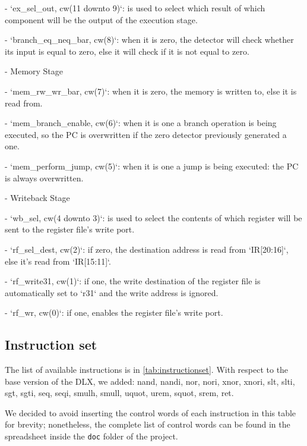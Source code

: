 \begin{markdown}
    - `ex_sel_out, cw(11 downto 9)`: is used to select which result of which component will be the output of the execution stage. 

    - `branch_eq_neq_bar, cw(8)`: when it is zero, the detector will check whether its input is equal to zero, else it will check if it is not equal to zero.

- Memory Stage

    - `mem_rw_wr_bar, cw(7)`: when it is zero, the memory is written to, else it is read from.

    - `mem_branch_enable, cw(6)`: when it is one a branch operation is being executed, so the PC is overwritten if the zero detector previously generated a one.

    - `mem_perform_jump, cw(5)`: when it is one a jump is being executed: the PC is always overwritten.

- Writeback Stage

    - `wb_sel, cw(4 downto 3)`: is used to select the contents of which register will be sent to the register file's write port.

    - `rf_sel_dest, cw(2)`: if zero, the destination address is read from `IR[20:16]`, else it's read from `IR[15:11]`.

    - `rf_write31, cw(1)`: if one, the write destination of the register file is automatically set to `r31` and the write address is ignored.

    - `rf_wr, cw(0)`: if one, enables the register file's write port.
 
\end{markdown}

\subsection{Instruction set}

The list of available instructions is in \autoref{tab:instructionset}.
With respect to the base version of the DLX, we added: nand, nandi, nor, nori, xnor, xnori, slt, slti, sgt, sgti, seq, seqi, smulh, smull, uquot, urem, squot, srem, ret.

We decided to avoid inserting the control words of each instruction in this table for brevity; nonetheless, the complete list of control words can be found in the spreadsheet inside the \texttt{doc} folder of the project.

